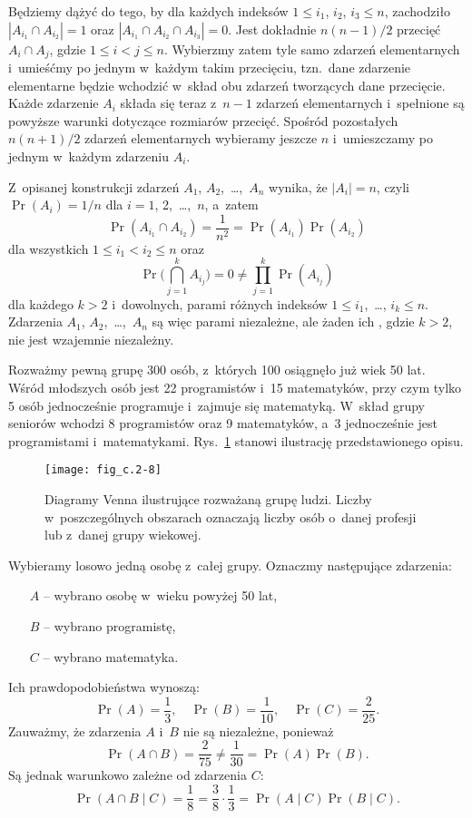 Będziemy dążyć do tego, by dla każdych indeksów $1\le i_1$, $i_2$, $i_3\le n$, zachodziło $|A_{i_1}\cap A_{i_2}|=1$ oraz $|A_{i_1}\cap A_{i_2}\cap A_{i_3}|=0$. Jest dokładnie $n(n-1)/2$ przecięć $A_i\cap A_j$, gdzie $1\le i<j\le n$. Wybierzmy zatem tyle samo zdarzeń elementarnych i~umieśćmy po jednym w~każdym takim przecięciu, tzn.\ dane zdarzenie elementarne będzie wchodzić w~skład obu zdarzeń tworzących dane przecięcie. Każde zdarzenie $A_i$ składa się teraz z~$n-1$ zdarzeń elementarnych i~spełnione są powyższe warunki dotyczące rozmiarów przecięć. Spośród pozostałych $n(n+1)/2$ zdarzeń elementarnych wybieramy jeszcze $n$ i~umieszczamy po jednym w~każdym zdarzeniu $A_i$.

Z~opisanej konstrukcji zdarzeń $A_1$, $A_2$,~\dots,~$A_n$ wynika, że $|A_i|=n$, czyli $\Pr(A_i)=1/n$ dla $i=1$, 2,~\dots,~$n$, a~zatem
\[
	\Pr(A_{i_1}\cap A_{i_2}) = \frac{1}{n^2} = \Pr(A_{i_1})\Pr(A_{i_2})
\]
dla wszystkich $1\le i_1<i_2\le n$ oraz
\[
	\Pr\biggl(\bigcap_{j=1}^kA_{i_j}\biggr) = 0 \ne \prod_{j=1}^k\Pr(A_{i_j})
\]
dla każdego $k>2$ i~dowolnych, parami różnych indeksów $1\le i_1$,~\dots, $i_k\le n$. Zdarzenia $A_1$, $A_2$,~\dots,~$A_n$ są więc parami niezależne, ale żaden ich , gdzie $k>2$, nie jest wzajemnie niezależny.

\exercise %
Rozważmy pewną grupę 300 osób, z~których 100 osiągnęło już wiek 50 lat. Wśród młodszych osób jest 22 programistów i~15 matematyków, przy czym tylko 5 osób jednocześnie programuje i~zajmuje się matematyką. W~skład grupy seniorów wchodzi 8 programistów oraz 9 matematyków, a~3 jednocześnie jest programistami i~matematykami. Rys.~\ref{fig:C.2-8} stanowi ilustrację przedstawionego opisu.
\begin{figure}[ht]
	\begin{center}
		\texttt{[image: fig\_c.2-8]}
	\end{center}
	\caption{Diagramy Venna ilustrujące rozważaną grupę ludzi. Liczby w~poszczególnych obszarach oznaczają liczby osób o~danej profesji lub z~danej grupy wiekowej.} \label{fig:C.2-8}
\end{figure}

Wybieramy losowo jedną osobę z~całej grupy. Oznaczmy następujące zdarzenia:
\begin{itemize}
	\item[$A$] -- wybrano osobę w~wieku powyżej 50 lat,
	\item[$B$] -- wybrano programistę,
	\item[$C$] -- wybrano matematyka.
\end{itemize}
Ich prawdopodobieństwa wynoszą:
\[
	\Pr(A) = \frac{1}{3}, \quad \Pr(B) = \frac{1}{10}, \quad \Pr(C) = \frac{2}{25}.
\]
Zauważmy, że zdarzenia $A$ i~$B$ nie są niezależne, ponieważ
\[
	\Pr(A\cap B) = \frac{2}{75} \ne \frac{1}{30} = \Pr(A)\Pr(B).
\]
Są jednak warunkowo zależne od zdarzenia $C$:
\[
	\Pr(A\cap B\mid C) = \frac{1}{8} = \frac{3}{8}\cdot\frac{1}{3} = \Pr(A\mid C)\Pr(B\mid C).
\]

